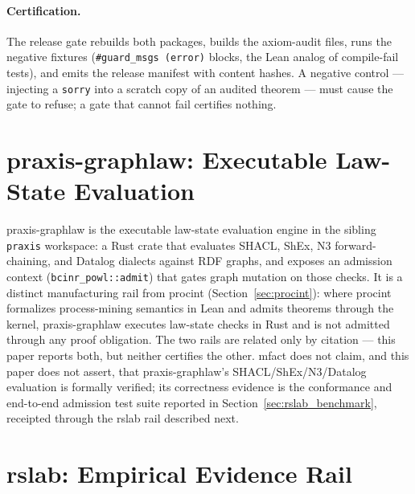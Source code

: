 \documentclass[11pt]{article}
\begin{document}
\paragraph{Certification.}
The release gate rebuilds both packages, builds the axiom-audit files,
runs the negative fixtures (\texttt{\#guard\_msgs (error)} blocks, the Lean
analog of compile-fail tests), and emits the release manifest with content
hashes. A negative control --- injecting a \texttt{sorry} into a scratch
copy of an audited theorem --- must cause the gate to refuse; a gate that
cannot fail certifies nothing.

\section{praxis-graphlaw: Executable Law-State Evaluation}
\label{sec:praxis-graphlaw}

praxis-graphlaw is the executable law-state evaluation engine in the
sibling \texttt{praxis} workspace: a Rust crate that evaluates SHACL,
ShEx, N3 forward-chaining, and Datalog dialects against RDF graphs, and
exposes an admission context (\texttt{bcinr\_powl::admit}) that gates
graph mutation on those checks. It is a distinct manufacturing rail from
\textsf{procint} (Section~\ref{sec:procint}): where \textsf{procint}
formalizes process-mining semantics in Lean and admits theorems through
the kernel, praxis-graphlaw executes law-state checks in Rust and is not
admitted through any proof obligation. The two rails are related only by
citation --- this paper reports both, but neither certifies the other.
\textsf{mfact} does not claim, and this paper does not assert, that
praxis-graphlaw's SHACL/ShEx/N3/Datalog evaluation is formally verified;
its correctness evidence is the conformance and end-to-end admission test
suite reported in Section~\ref{sec:rslab_benchmark}, receipted through
the rslab rail described next.

\section{rslab: Empirical Evidence Rail}
\label{sec:rslab}
\end{document}
